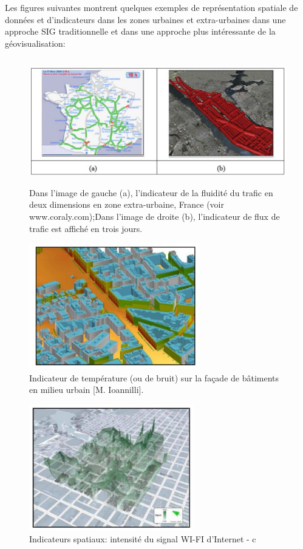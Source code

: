\documentclass[french, a4paper, 12pt]{report}
\begin{document}
Les figures suivantes montrent quelques exemples de représentation spatiale de données et d'indicateurs dans les zones urbaines et extra-urbaines dans une approche SIG traditionnelle et dans une approche plus intéressante de la géovisualisation:
\begin{figure}[!htp]
    \centering
    \includegraphics[height=5.5cm]{images/geo4.jpg}
    \caption{Dans l'image de gauche (a), l'indicateur de la fluidité du trafic en deux dimensions en zone extra-urbaine, France (voir www.coraly.com);Dans l'image de droite (b), l'indicateur de flux de trafic est affiché en trois jours.}
    \label{fig:2.13}
\end{figure}

\begin{figure}[!htp]
    \centering
    \includegraphics[height=5.5cm]{images/geo2.jpg}
    \caption{Indicateur de température (ou de bruit) sur la façade de bâtiments en milieu urbain [M. Ioannilli].}
    \label{fig:2.14}
\end{figure}

\begin{figure}[!htp]
    \centering
    \includegraphics[height=5.5cm]{images/geo3.jpg}
    \caption{Indicateurs spatiaux: intensité du signal WI-FI d’Internet - c}
    \label{fig:2.15}
\end{figure}
\end{document}
